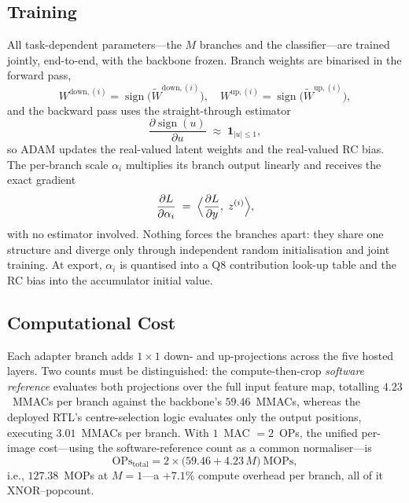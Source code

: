 \documentclass[journal]{IEEEtran}
\begin{document}
\subsection{Training}
All task-dependent parameters---the $M$ branches and the classifier---are trained jointly, end-to-end, with the backbone frozen. Branch weights are binarised in the forward pass,
\begin{equation}
W^{\text{down},(i)} = \operatorname{sign}\bigl(\widetilde{W}^{\text{down},(i)}\bigr), \quad
W^{\text{up},(i)} = \operatorname{sign}\bigl(\widetilde{W}^{\text{up},(i)}\bigr),
\label{eq:binarise}
\end{equation}
and the backward pass uses the straight-through estimator
\begin{equation}
\frac{\partial \operatorname{sign}(u)}{\partial u} \;\approx\; \mathbf{1}_{|u| \le 1},
\label{eq:ste}
\end{equation}
so ADAM updates the real-valued latent weights and the real-valued RC bias. The per-branch scale $\alpha_i$ multiplies its branch output linearly and receives the exact gradient
\begin{equation}
\frac{\partial L}{\partial \alpha_i} \;=\; \Bigl\langle \frac{\partial L}{\partial y},\; z^{(i)} \Bigr\rangle,
\label{eq:alpha}
\end{equation}
with no estimator involved. Nothing forces the branches apart: they share one structure and diverge only through independent random initialisation and joint training. At export, $\alpha_i$ is quantised into a Q8 contribution look-up table and the RC bias into the accumulator initial value.

\subsection{Computational Cost}
Each adapter branch adds $1{\times}1$ down- and up-projections across the five hosted layers. Two counts must be distinguished: the compute-then-crop \emph{software reference} evaluates both projections over the full input feature map, totalling $4.23$~MMACs per branch against the backbone's $59.46$~MMACs, whereas the deployed RTL's centre-selection logic evaluates only the output positions, executing $3.01$~MMACs per branch. With $1$~MAC $=2$~OPs, the unified per-image cost---using the software-reference count as a common normaliser---is
\begin{equation}
\mathrm{OPs}_{\text{total}} = 2 \times \bigl(59.46 + 4.23\,M\bigr)~\text{MOPs},
\label{eq:ops}
\end{equation}
i.e., $127.38$~MOPs at $M{=}1$---a $+7.1\%$ compute overhead per branch, all of it XNOR--popcount.
\end{document}
